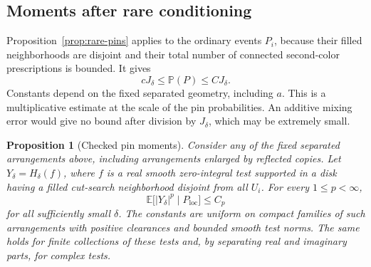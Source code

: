 \documentclass[11pt]{article}
\newcommand{\E}{\mathbb E}
\newcommand{\Prob}{\mathbb P}
\newtheorem{proposition}[theorem]{Proposition}
\theoremstyle{definition}
\theoremstyle{remark}
\numberwithin{equation}{section}
\begin{document}
\subsection{Moments after rare conditioning}

Proposition~\ref{prop:rare-pins} applies to the ordinary events $P_i$,
because their filled neighborhoods are disjoint and their total number
of connected second-color prescriptions is bounded.  It gives
\begin{equation}\label{pins:multiplicative}
 c J_\delta\le\Prob(P)\le C J_\delta.
\end{equation}
Constants depend on the fixed separated geometry, including $a$.
This is a multiplicative estimate at the scale of the pin probabilities.
An additive mixing error would give no bound after division by
$J_\delta$, which may be extremely small.

\begin{proposition}[Checked pin moments]\label{prop:pin-moments}
Consider any of the fixed separated arrangements above, including
arrangements enlarged by reflected copies.  Let $Y_\delta=H_\delta(f)$,
where $f$ is a real smooth zero-integral test supported in a disk having a
filled cut-search neighborhood disjoint from all $U_i$.  For every
$1\le p<\infty$,
\begin{equation}\label{eq:pin-moments}
 \E\bigl[|Y_\delta|^p\mid P_{\mathrm{loc}}\bigr]\le C_p
\end{equation}
for all sufficiently small $\delta$.  The constants are uniform on
compact families of such arrangements with positive clearances and
bounded smooth test norms.  The same holds for finite collections of
these tests and, by separating real and imaginary parts, for complex
tests.
\end{proposition}
\end{document}
